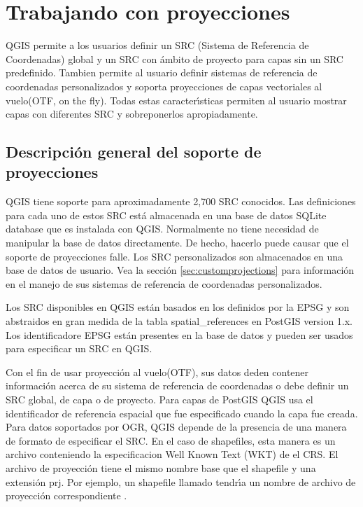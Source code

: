 
\section{Trabajando con proyecciones}\label{label_projections}


QGIS permite a los usuarios definir un SRC (Sistema de Referencia de
Coordenadas) global y un SRC con \'ambito de proyecto para capas sin un SRC predefinido. Tambien permite al
usuario definir sistemas de referencia de coordenadas personalizados y soporta proyecciones de capas
vectoriales al vuelo(OTF, on the fly). Todas estas caracter\'{\i}sticas permiten al usuario mostrar
capas con diferentes SRC y sobreponerlos apropiadamente.

\subsection{Descripci\'on general del soporte de proyecciones}\label{label_projoverview}

QGIS tiene soporte para aproximadamente 2,700 SRC conocidos. Las definiciones para 
cada uno de estos SRC est\'a almacenada en una base de datos SQLite database que es instalada con
QGIS. Normalmente no tiene  necesidad de manipular la base de datos directamente. De hecho,
hacerlo puede causar que el soporte de proyecciones falle. Los SRC personalizados son almacenados en una
base de datos de usuario. Vea la secci\'on \ref{sec:customprojections} para 
informaci\'on en el manejo de sus sistemas de referencia de coordenadas personalizados.

Los SRC disponibles en QGIS est\'an basados en los definidos por la
EPSG y son abstraidos en gran medida de la tabla spatial\_references 
en PostGIS version 1.x. Los identificadore EPSG est\'an
presentes en la base de datos y pueden ser usados para especificar un SRC en QGIS.

Con el fin de usar proyecci\'on al vuelo(OTF), sus datos deden contener informaci\'on acerca de su
sistema de referencia de coordenadas o debe definir un SRC global, de capa o
de proyecto. Para capas de PostGIS QGIS usa el identificador de referencia espacial
que fue especificado cuando la capa fue creada. Para datos soportados
por OGR, QGIS depende de la presencia de una manera de formato de especificar
el SRC. En el caso de shapefiles, esta manera es un archivo conteniendo la especificacion Well
Known Text (WKT) de el CRS. El archivo de proyecci\'on
tiene el mismo nombre base que el shapefile y una extensi\'on prj. Por ejemplo, un
shapefile llamado  tendr\'{\i}a un nombre de archivo de proyecci\'on
correspondiente .

